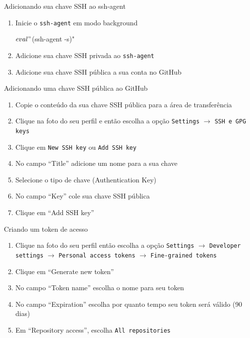\documentclass[14pt]{beamer}
\begin{document}
\begin{frame}[fragile]{Adicionando sua chave SSH ao ssh-agent}
    \begin{enumerate}
        \item Inicie o \texttt{ssh-agent} em modo background
        \begin{bashcode}
            $ eval "$(ssh-agent -s)"
        \end{bashcode}
        \item Adicione sua chave SSH privada ao \texttt{ssh-agent}
        \item Adicione sua chave SSH pública a sua conta no GitHub
    \end{enumerate}
\end{frame}

\begin{frame}{Adicionando uma chave SSH pública ao GitHub}
    \begin{enumerate}
        \item Copie o conteúdo da sua chave SSH pública para a área de
        transferência
        \item Clique na foto do seu perfil e então escolha a opção
        \texttt{Settings} $\rightarrow$ \texttt{SSH e GPG keys}
        \item Clique em \texttt{New SSH key} ou \texttt{Add SSH key}
        \item No campo ``Title'' adicione um nome para a sua chave
        \item Selecione o tipo de chave (Authentication Key)
        \item No campo ``Key'' cole sua chave SSH pública
        \item Clique em ``Add SSH key''
    \end{enumerate}
\end{frame}

\begin{frame}{Criando um token de acesso}
    \begin{enumerate}
        \item Clique na foto do seu perfil então escolha a opção
        \texttt{Settings} $\rightarrow$ \texttt{Developer settings}
        $\rightarrow$ \texttt{Personal access tokens} $\rightarrow$
        \texttt{Fine-grained tokens}
        \item Clique em ``Generate new token''
        \item No campo ``Token name'' escolha o nome para seu token
        \item No campo ``Expiration'' escolha por quanto tempo seu token será
        válido (90 dias)
        \item Em ``Repository access'', escolha \texttt{All repositories}
    \end{enumerate}
\end{frame}
\end{document}

